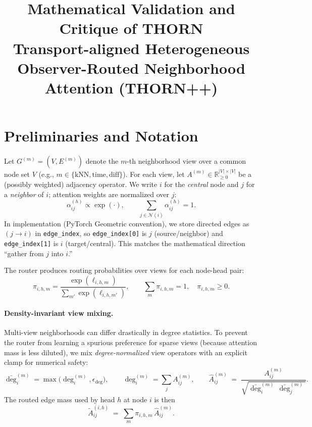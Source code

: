 \documentclass[11pt]{article}
\title{Mathematical Validation and Critique of THORN\\
\large Transport-aligned Heterogeneous Observer-Routed Neighborhood Attention (THORN++)}
\author{}
\date{}
\begin{document}
\maketitle

\section{Preliminaries and Notation}

Let $G^{(m)}=(V,E^{(m)})$ denote the $m$-th neighborhood view over a common node set $V$ (e.g., $m\in\{\text{kNN},\text{time},\text{diff}\}$).
For each view, let $A^{(m)}\in\mathbb{R}_{\ge 0}^{|V|\times |V|}$ be a (possibly weighted) adjacency operator.
We write $i$ for the \emph{central} node and $j$ for a \emph{neighbor} of $i$; attention weights are normalized over $j$:
\[
\alpha_{ij}^{(h)} \propto \exp(\cdot),\qquad \sum_{j\in\mathcal{N}(i)}\alpha_{ij}^{(h)}=1.
\]
In implementation (PyTorch Geometric convention), we store directed edges as $(j\to i)$ in \texttt{edge\_index}, so \texttt{edge\_index[0]} is $j$ (source/neighbor) and \texttt{edge\_index[1]} is $i$ (target/central). This matches the mathematical direction ``gather from $j$ into $i$.''

The router produces routing probabilities over views for each node-head pair:
\[
\pi_{i,h,m}=\frac{\exp(\ell_{i,h,m})}{\sum_{m'}\exp(\ell_{i,h,m'})},
\qquad \sum_m \pi_{i,h,m}=1,\quad \pi_{i,h,m}\ge 0.
\]

\paragraph{Density-invariant view mixing.}
Multi-view neighborhoods can differ drastically in degree statistics. To prevent the router from learning a spurious preference for sparse views (because attention mass is less diluted), we mix \emph{degree-normalized} view operators with an explicit clamp for numerical safety:
\[
\bar\deg_i^{(m)}=\max\!\big(\deg_i^{(m)},\epsilon_{\deg}\big),
\qquad
\deg_i^{(m)}=\sum_{j} A_{ij}^{(m)},
\qquad
\hat A_{ij}^{(m)} \;=\; \frac{A_{ij}^{(m)}}{\sqrt{\bar\deg_i^{(m)}\,\bar\deg_j^{(m)}}}.
\]
The routed edge mass used by head $h$ at node $i$ is then
\begin{equation}
\label{eq:routedA}
\tilde A_{ij}^{(i,h)} \;=\; \sum_m \pi_{i,h,m}\,\hat A_{ij}^{(m)}.
\end{equation}
\end{document}
